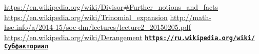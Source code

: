 \documentclass{article}
\begin{document}
  \vfill
  \begin{thebibliography}{9}
     \url{https://en.wikipedia.org/wiki/Divisor#Further_notions_and_facts}
     \url{https://en.wikipedia.org/wiki/Trinomial_expansion}
     \url{http://math-hse.info/a/2014-15/soc-dm/lectures/lecture2_20150205.pdf}
     \url{https://en.wikipedia.org/wiki/Derangement}
     \href{https://ru.wikipedia.org/wiki/%D0%A1%D1%83%D0%B1%D1%84%D0%B0%D0%BA%D1%82%D0%BE%D1%80%D0%B8%D0%B0%D0%BB}{\textbf{\texttt{https://ru.wikipedia.org/wiki/Субфакториал}}}
  \end{thebibliography}
\end{document}
